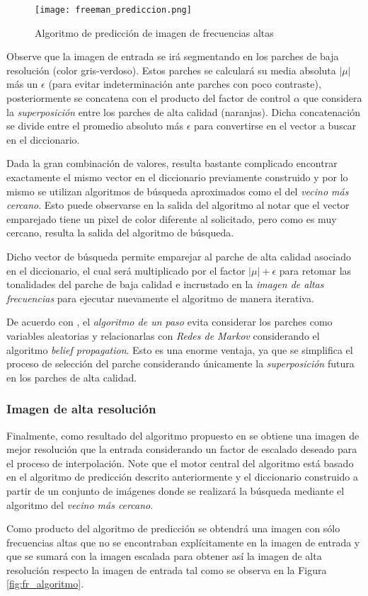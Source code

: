 \begin{figure}[H]
    \texttt{[image:  freeman\_prediccion.png]}
    \centering
    \caption{ Algoritmo de predicción de imagen de frecuencias altas }
    \label{fig:fr_prediccion}
\end{figure}

Observe que la imagen de entrada se irá segmentando en los parches de baja 
resolución (color gris-verdoso). Estos parches se calculará su media absoluta 
$|\mu|$ más un $\epsilon$ (para evitar indeterminación ante parches con poco
contraste), posteriormente se concatena con el producto del factor de control 
$\alpha$ que considera la \emph{superposición} entre los parches de alta calidad
(naranjas). Dicha concatenación se divide entre el promedio absoluto más $\epsilon$
para convertirse en el vector a buscar en el diccionario. 

Dada la gran combinación de valores, resulta bastante complicado encontrar 
exactamente el mismo vector en el diccionario previamente construido y por
lo mismo se utilizan algoritmos de búsqueda aproximados como el del \emph{vecino
más cercano}. Esto puede observarse en la salida del algoritmo al notar que el 
vector emparejado tiene un pixel de color diferente al solicitado, pero como 
es muy cercano, resulta la salida del algoritmo de búsqueda. 

Dicho vector de búsqueda permite emparejar al parche de alta calidad asociado
en el diccionario, el cual será multiplicado por el factor $|\mu|+\epsilon$ para 
retomar las tonalidades del parche de baja calidad e incrustado en la \emph{imagen de altas frecuencias}
para ejecutar nuevamente el algoritmo de manera iterativa.

De acuerdo con \cite{freeman}, el \emph{algoritmo de un paso} evita considerar
los parches como variables aleatorias y relacionarlas con \emph{Redes de Markov}
considerando el algoritmo \emph{belief propagation}. Esto es una enorme ventaja,
ya que se simplifica el proceso de selección del parche considerando 
únicamente la \emph{superposición} futura en los parches de alta calidad. 

\subsubsection{Imagen de alta resolución}
\noindent
Finalmente, como resultado del algoritmo propuesto en \cite{freeman} se obtiene
una imagen de mejor resolución que la entrada considerando un factor de escalado
deseado para el proceso de interpolación. Note que el motor central del algoritmo
está basado en el algoritmo de predicción descrito anteriormente y el diccionario
construido a partir de un conjunto de imágenes donde se realizará la búsqueda
mediante el algoritmo del \emph{vecino más cercano}. 

Como producto del algoritmo de predicción se obtendrá una imagen con sólo frecuencias
altas que no se encontraban explícitamente en la imagen de entrada y que se sumará
con la imagen escalada para obtener así la imagen de alta resolución respecto
la imagen de entrada tal como se observa en la Figura \ref{fig:fr_algoritmo}.